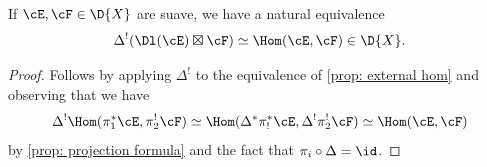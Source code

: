 \begin{cor}
  If $\cE,\cF\in \D{X}$ are suave, we have a natural equivalence
  \[ \Delta^{!}(\Dl(\cE)\boxtimes \cF)\simeq\Hom(\cE, \cF) \in \D{X} .\]
\end{cor}
\begin{proof}
  Follows by applying $\Delta^{!}$ to the equivalence of \cref{prop: external hom} and
  observing that we have
  \[ \Delta^{!}\Hom(\pi_{1}^{\ast}\cE, \pi_{2}^{!}\cF)
    \simeq \Hom(\Delta^{\ast}\pi_{!}^{\ast}\cE, \Delta^{!}\pi_{2}^{!}\cF)
  \simeq \Hom(\cE, \cF)\]
by \cref{prop: projection formula} and the fact that $\pi_{i}\circ \Delta=\id$.
\end{proof}




